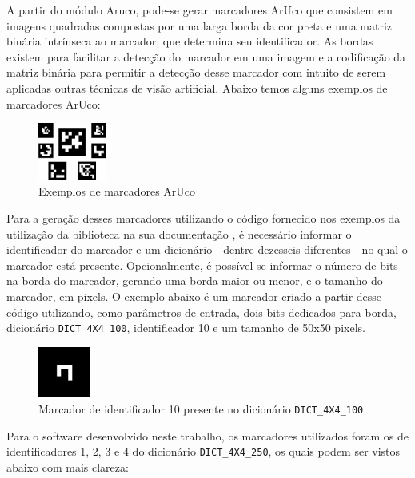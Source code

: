 \documentclass[12pt]{report}
\begin{document}
A partir do módulo Aruco, pode-se gerar marcadores ArUco que consistem
em imagens quadradas compostas por uma larga borda da cor preta e
uma matriz binária intrínseca ao marcador, que determina seu
identificador. As bordas existem para facilitar a detecção do marcador
em uma imagem e a codificação da matriz binária para permitir a
detecção desse marcador com intuito de serem aplicadas outras técnicas
de visão artificial. Abaixo temos alguns exemplos de marcadores ArUco:

\begin{figure}[H]
  \centering
    \includegraphics[width=0.2\textwidth]{imagens/markers.jpg}
    \caption{Exemplos de marcadores ArUco}
  \label{fig:arucoMarkers}
\end{figure}

Para a geração desses marcadores utilizando o código fornecido nos
exemplos da utilização da biblioteca na sua documentação
\cite{opencv}, é necessário informar o identificador do marcador e um
dicionário - dentre dezesseis diferentes - no qual o marcador está
presente. Opcionalmente, é possível se informar o número de bits na
borda do marcador, gerando uma borda maior ou menor, e o tamanho do
marcador, em pixels. O exemplo abaixo é um marcador criado a partir
desse código utilizando, como parâmetros de entrada, dois bits
dedicados para borda, dicionário \texttt{DICT\_4X4\_100},
identificador 10 e um tamanho de 50x50 pixels.

\begin{figure}[H]
  \centering
    \includegraphics[width=0.15\textwidth]{imagens/marker.png}
    \caption{Marcador de identificador 10 presente no dicionário \texttt{DICT\_4X4\_100}}
  \label{fig:markers210}
\end{figure}

Para o software desenvolvido neste trabalho, os marcadores utilizados
foram os de identificadores 1, 2, 3 e 4 do dicionário
\texttt{DICT\_4X4\_250}, os quais podem ser vistos abaixo com mais
clareza:
\end{document}
